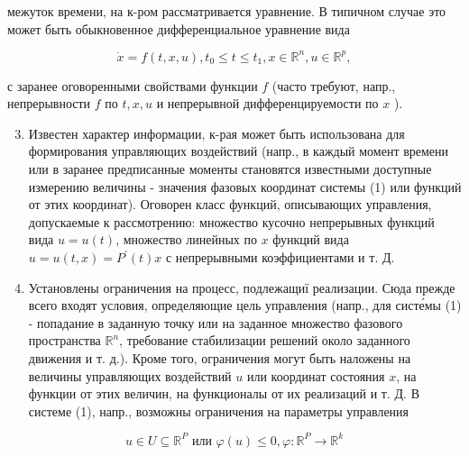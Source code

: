 \documentclass[10pt]{article}
\begin{document}
межуток времени, на к-ром рассматривается уравнение. В типичном случае это может быть обыкновенное дифференциальное уравнение вида



\[

\dot{x}=f(t, x, u), t_{0} \leqslant t \leqslant t_{1}, x \in \mathbb{R}^{n}, u \in \mathbb{R}^{p},

\]



с заранее оговоренными свойствами функции $f$ (часто требуют, напр., непрерывности $f$ по $t, x, u$ и непрерывной дифференцируемости по $x$ ).



\begin{enumerate}

  \setcounter{enumi}{2}

  \item Известен характер информации, к-рая может быть использована для формирования управляющих воздействий (напр., в каждый момент времени или в заранее предписанные моменты становятся известными доступные измерению величины - значения фазовых координат системы (1) или функций от этих координат). Оговорен класс функций, описывающих управления, допускаемые к рассмотрению: множество кусочно непрерывных функций вида $u=u(t)$, множество линейных по $x$ функций вида $u=u(t, x)=P^{\prime}(t) x$ с непрерывными коэффициентами и т. Д.



  \item Установлены ограничения на процесс, подлежащиї реализации. Сюда прежде всего входят условия, определяющие цель управления (напр., для систе́мы (1) - попадание в заданную точку или на заданное множество фазового пространства $\mathbb{R}^{n}$, требование стабилизации решений около заданного движения и т. д.). Кроме того, ограничения могут быть наложены на величины управляющих воздействий $u$ или координат состояния $x$, на функции от этих величин, на функционалы от их реализаций и т. Д. В системе (1), напр., возможны ограничения на параметры управления



\end{enumerate}



\[

u \in U \subseteq \mathbb{R}^{P} \text { или } \varphi(u) \leqslant 0, \varphi: \mathbb{R}^{P} \longrightarrow \mathbb{R}^{k}

\]
\end{document}
